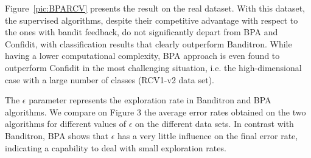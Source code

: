 \documentclass[preprint,12pt,authoryear]{elsarticle}
\begin{document}

Figure~\ref{pic:BPARCV} %
presents the result on the real dataset. With this dataset, the supervised algorithms, despite their competitive advantage with respect to the ones with bandit feedback, do not significantly depart from BPA and Confidit, with classification results that clearly outperform Banditron. While having a lower computational complexity, BPA approach is even found to outperform Confidit in the most challenging situation, i.e. the high-dimensional case with a large number of classes (RCV1-v2 data set).

The $\epsilon$ parameter represents the exploration rate in Banditron and BPA algorithms. We compare on Figure 3 the average error rates obtained on the two algorithms for different values of $\epsilon$ on the different data sets. In contrast with Banditron, BPA shows that $\epsilon$ has a very little influence on the final error rate, indicating a capability to deal with small exploration rates.
\end{document}
